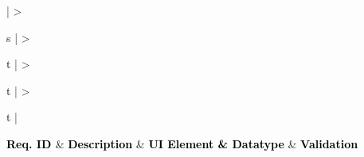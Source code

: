 \documentclass[hidelinks,a4paper,12pt]{article}
\begin{document}
\begin{center}
	{
	\setlength{\extrarowheight}{2pt}

	\newcolumntype{b}{X}
		
	\renewcommand\thetable{2} 					
	 \label{table:2}
	\vspace{0.25cm}
									
	\begin{tabularx}{\textwidth}{ | >{\ttfamily\raggedright\arraybackslash} s 
	| >{\ttfamily\raggedright\arraybackslash} t 
	| >{\ttfamily\raggedright\arraybackslash} t 	
	| >{\ttfamily\raggedright\arraybackslash} t | }
								
	\hline
								
	{\textbf{\textcolor{black}{ {Req. ID} \newline}}} & {\textbf{\textcolor{black}{ { Description}}}} & {\textbf{\textcolor{black}{ {UI Element \& Datatype}}}} & \textbf{\textcolor{black}{ {Validation}}} \\
								

\end{tabularx}}
\end{center}
\end{document}
